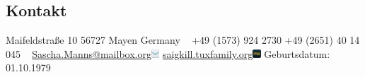 \documentclass[a4paper]{friggeri-cv} %
\begin{document}


\begin{aside} %
\section{Kontakt}
Maifeldstraße 10
56727 Mayen
Germany
~
+49 (1573) 924 2730
+49 (2651) 40 14 045
~
\href{mailto:Sascha.Manns@mailbox.org}{Sascha.Manns@mailbox.org}\includegraphics[width=0.3cm]{../Pictures/email.png}
\href{http://saigkill.tuxfamily.org}{saigkill.tuxfamily.org}\includegraphics[width=0.3cm]{../Pictures/aboutme.png}
Geburtsdatum: 01.10.1979

\end{aside}
\end{document}
